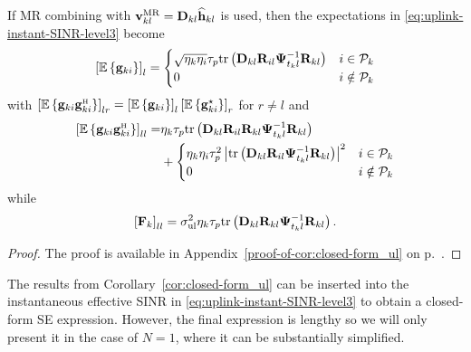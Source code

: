 \begin{corollary} \label{cor:closed-form_ul}
	If MR combining with $\mathbf{v}_{kl}^{{\rm MR}} = \mathbf{D}_{kl} \widehat{\mathbf{h}}_{kl}$ is used, then the expectations in \eqref{eq:uplink-instant-SINR-level3} become
	\begin{align}  \label{eq:g_ki-expectation}
\left [ 	\mathbb{E} \left\{\mathbf{g}_{ki}\right\} \right ]_l=\begin{cases}  \sqrt{\eta_k\eta_i}\tau_p \mathrm{tr}\left( \mathbf{D}_{kl} \mathbf{R}_{il} \mathbf{\Psi}_{t_k l}^{-1} \mathbf{R}_{kl}\right) &   i\in\mathcal{P}_k \\
0 & i\notin\mathcal{P}_k  \end{cases}
	\end{align}
	with $\left[	\mathbb{E} \left\{\vect{g}_{ki} \vect{g}_{ki}^{\Htran}\right\} \right]_{lr} = \left [ 	\mathbb{E} \left\{\vect{g}_{ki}\right\} \right ]_l  \left [ 	\mathbb{E} \left\{\vect{g}_{ki}^{\star}\right\} \right ]_r $ for $ r \neq l$ and 
		\begin{align} 
\left[	\mathbb{E} \left\{\vect{g}_{ki} \vect{g}_{ki}^{\Htran}\right\} \right]_{ll} =& \eta_k\tau_p  \tr \left(  \vect{D}_{kl}\vect{R}_{il} \vect{R}_{kl} \vect{\Psi}_{t_k l}^{-1} \vect{R}_{kl}  \right) \nonumber \\ \label{eq:gki-second-moment}
&+ \begin{cases}
	\eta_k\eta_i\tau_p^{2}  \left|\tr \left(  \vect{D}_{kl} \vect{R}_{il} \vect{\Psi}_{t_k l}^{-1} \vect{R}_{kl}  \right)\right|^2   &   i\in\mathcal{P}_k
	\\
	0 & i\notin\mathcal{P}_k
	\end{cases}
	\end{align}
	while
	\begin{equation} \label{eq:F_kl}
\left[ \mathbf{F}_k \right]_{ll}= \sigma^2_{\mathrm{ul}}\eta_k \tau_p  \mathrm{tr}\left( \mathbf{D}_{kl} \mathbf{R}_{kl} \mathbf{\Psi}_{t_k l}^{-1} \mathbf{R}_{kl}\right).
	\end{equation}
	\end{corollary}
	\begin{proof}
	The proof is available in Appendix~\ref{proof-of-cor:closed-form_ul} on p.~\pageref{proof-of-cor:closed-form_ul}.
	\end{proof}
	
The results from Corollary~\ref{cor:closed-form_ul} can be inserted into the instantaneous effective SINR in \eqref{eq:uplink-instant-SINR-level3} to obtain a closed-form SE expression. However, the final expression is lengthy so we will only present it in the case of $N=1$, where it can be substantially simplified.
	
